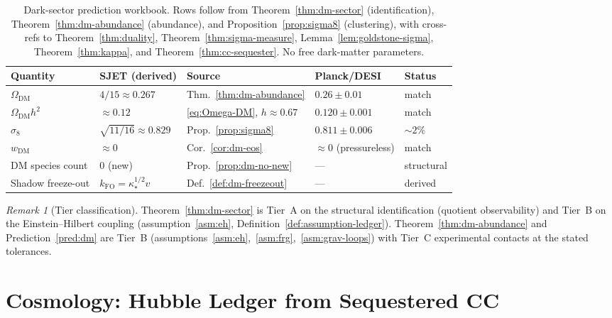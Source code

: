 \documentclass[aps,prd,onecolumn,amsmath,amssymb,nofootinbib,11pt]{revtex4-2}
\numberwithin{equation}{section}
\theoremstyle{plain}
\theoremstyle{definition}
\theoremstyle{remark}
\newtheorem{remark}[theorem]{Remark}
\begin{document}
\begin{table}[ht]
\centering
\small
\renewcommand{\arraystretch}{1.12}
\begin{tabular}{@{}lllll@{}}
\toprule
\textbf{Quantity} & \textbf{SJET (derived)} & \textbf{Source} & \textbf{Planck/DESI} & \textbf{Status} \\
\midrule
$\Omega_{\mathrm{DM}}$ & $4/15\approx 0.267$ & Thm.~\ref{thm:dm-abundance} & $0.26\pm 0.01$ & match \\
$\Omega_{\mathrm{DM}}h^2$ & $\approx 0.12$ & \eqref{eq:Omega-DM}, $h\approx 0.67$ & $0.120\pm 0.001$ & match \\
$\sigma_8$ & $\sqrt{11/16}\approx 0.829$ & Prop.~\ref{prop:sigma8} & $0.811\pm 0.006$ & $\sim 2\%$ \\
$w_{\mathrm{DM}}$ & $\approx 0$ & Cor.~\ref{cor:dm-eos} & $\approx 0$ (pressureless) & match \\
DM species count & $0$ (new) & Prop.~\ref{prop:dm-no-new} & --- & structural \\
Shadow freeze-out & $k_{\mathrm{FO}}=\kappa_\star^{1/2}v$ & Def.~\ref{def:dm-freezeout} & --- & derived \\
\bottomrule
\end{tabular}
\caption{Dark-sector prediction workbook. Rows follow from
Theorem~\ref{thm:dm-sector} (identification),
Theorem~\ref{thm:dm-abundance} (abundance), and
Proposition~\ref{prop:sigma8} (clustering), with cross-refs to
Theorem~\ref{thm:duality}, Theorem~\ref{thm:sigma-measure},
Lemma~\ref{lem:goldstone-sigma}, Theorem~\ref{thm:kappa}, and
Theorem~\ref{thm:cc-sequester}. No free dark-matter parameters.}
\label{tab:dark-sector}
\end{table}

\begin{remark}[Tier classification]
Theorem~\ref{thm:dm-sector} is Tier~A on the structural identification
(quotient observability) and Tier~B on the Einstein--Hilbert coupling
(assumption~\ref{asm:eh}, Definition~\ref{def:assumption-ledger}).
Theorem~\ref{thm:dm-abundance} and Prediction~\ref{pred:dm} are Tier~B
(assumptions~\ref{asm:eh},~\ref{asm:frg},~\ref{asm:grav-loops}) with
Tier~C experimental contacts at the stated tolerances.
\end{remark}%
\section{Cosmology: Hubble Ledger from Sequestered CC}
\label{sec:cosmology}
\end{document}
